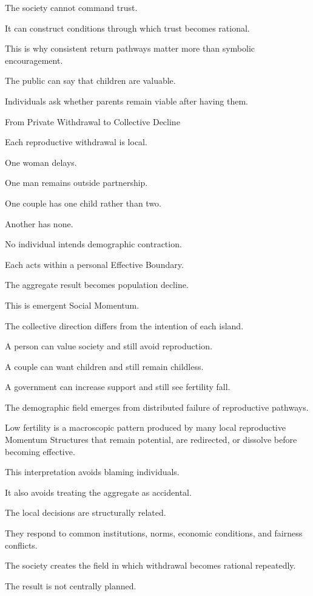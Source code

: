 The society cannot command trust.

It can construct conditions through which trust becomes rational.

This is why consistent return pathways matter more than symbolic encouragement.

The public can say that children are valuable.

Individuals ask whether parents remain viable after having them.

From Private Withdrawal to Collective Decline

Each reproductive withdrawal is local.

One woman delays.

One man remains outside partnership.

One couple has one child rather than two.

Another has none.

No individual intends demographic contraction.

Each acts within a personal Effective Boundary.

The aggregate result becomes population decline.

This is emergent Social Momentum.

The collective direction differs from the intention of each island.

A person can value society and still avoid reproduction.

A couple can want children and still remain childless.

A government can increase support and still see fertility fall.

The demographic field emerges from distributed failure of reproductive pathways.

Low fertility is a macroscopic pattern produced by many local reproductive Momentum Structures that remain potential, are redirected, or dissolve before becoming effective.

This interpretation avoids blaming individuals.

It also avoids treating the aggregate as accidental.

The local decisions are structurally related.

They respond to common institutions, norms, economic conditions, and fairness conflicts.

The society creates the field in which withdrawal becomes rational repeatedly.

The result is not centrally planned.

